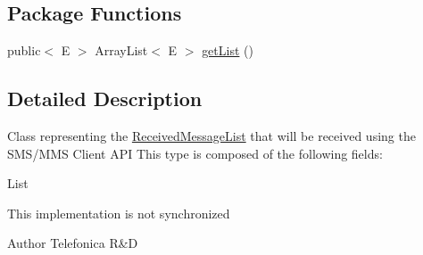 \subsection*{Package Functions}
\begin{DoxyCompactItemize}
\item 
public$<$ E $>$ ArrayList$<$ E $>$ \hyperlink{classcom_1_1bluevia_1_1messagery_1_1mo_1_1data_1_1ReceivedMessageList_a974a6690e062fa4a620a5b6cecba7956}{getList} ()
\end{DoxyCompactItemize}


\subsection{Detailed Description}
Class representing the \hyperlink{classcom_1_1bluevia_1_1messagery_1_1mo_1_1data_1_1ReceivedMessageList}{ReceivedMessageList} that will be received using the SMS/MMS Client API This type is composed of the following fields: 
\begin{DoxyItemize}
\item List 
\end{DoxyItemize}

This implementation is not synchronized

\begin{DoxyAuthor}{Author}
Telefonica R\&D 
\end{DoxyAuthor}


